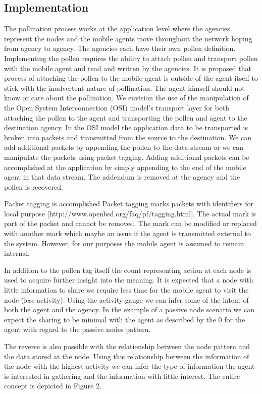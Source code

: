 \documentclass{acm_proc_article-sp}
\begin{document}
\subsection{Implementation}
The pollination process works at the application level where the agencies represent the nodes and the mobile agents move throughout the network hoping from agency to agency. The agencies each have their own pollen definition. Implementing the pollen requires the ability to attach pollen and transport pollen with the mobile agent and read and written by the agencies.  It is proposed that process of attaching the pollen to the mobile agent is outside of the agent itself to stick with the inadvertent nature of pollination. The agent himself should not know or care about the pollination. We envision the use of the manipulation of the Open System Interconnection (OSI) model’s transport layer for both attaching the pollen to the agent and transporting the pollen and agent to the destination agency. In the OSI model the application data to be transported is broken into packets and transmitted from the source to the destination. We can add additional packets by appending the pollen to the data stream or we can manipulate the packets using packet tagging. Adding additional packets can be accomplished at the application by simply appending to the end of the mobile agent in that data stream. The addendum is removed at the agency and the pollen is recovered.

Packet tagging is accomplished Packet tagging marks packets with identifiers for local purpose [http://www.openbsd.org/faq/pf/tagging.html]. The actual mark is part of the packet and cannot be removed. The mark can be modified or replaced with another mark which maybe an issue if the agent is transmitted external to the system. However, for our purposes the mobile agent is assumed to remain internal.

In addition to the pollen tag itself the count representing action at each node is used to acquire further insight into the meaning. It is expected that a node with little information to share we require less time for the mobile agent to visit the node (less activity). Using the activity gauge we can infer some of the intent of both the agent and the agency.  In the example of a passive node scenario we can expect the sharing to be minimal with the agent as described by the 0 for the agent with regard to the passive nodes pattern.

The reverse is also possible with the relationship between the node pattern and the data stored at the node. Using this relationship between the information of the node with the highest activity we can infer the type of information the agent is interested in gathering and the information with little interest.  The entire concept is depicted in Figure 2.
\end{document}
